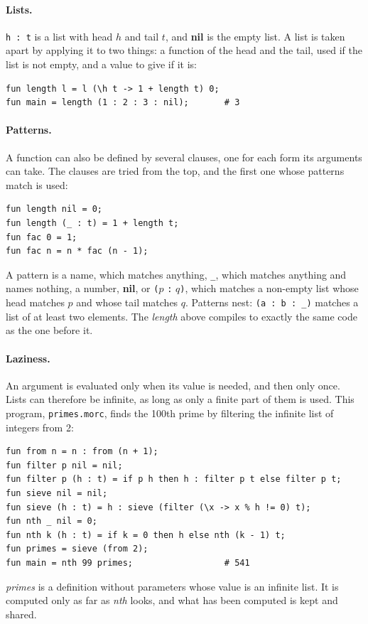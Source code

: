 \documentclass[11pt,a4paper]{article}
\theoremstyle{definition}
\theoremstyle{plain}
\newcommand{\kw}[1]{\textbf{#1}}
\begin{document}
\paragraph{Lists.} \verb|h : t| is a list with head $h$ and tail $t$, and
\kw{nil} is the empty list. A list is taken apart by applying it to two
things: a function of the head and the tail, used if the list is not empty,
and a value to give if it is:
\begin{lstlisting}[style=morc]
fun length l = l (\h t -> 1 + length t) 0;
fun main = length (1 : 2 : 3 : nil);       # 3
\end{lstlisting}

\paragraph{Patterns.} A function can also be defined by several clauses, one
for each form its arguments can take. The clauses are tried from the top,
and the first one whose patterns match is used:
\begin{lstlisting}[style=morc]
fun length nil = 0;
fun length (_ : t) = 1 + length t;
fun fac 0 = 1;
fun fac n = n * fac (n - 1);
\end{lstlisting}
A pattern is a name, which matches anything, \verb|_|, which matches anything
and names nothing, a number, \kw{nil}, or \verb|(|$p$ \verb|:| $q$\verb|)|,
which matches a non-empty list whose head matches $p$ and whose tail
matches $q$. Patterns nest: \verb|(a : b : _)| matches a list of at least two
elements. The \textit{length} above compiles to exactly the same code as the
one before it.

\paragraph{Laziness.} An argument is evaluated only when its value is needed,
and then only once. Lists can therefore be infinite, as long as only a finite
part of them is used. This program, \texttt{primes.morc}, finds the 100th
prime by filtering the infinite list of integers from 2:
\begin{lstlisting}[style=morc]
fun from n = n : from (n + 1);
fun filter p nil = nil;
fun filter p (h : t) = if p h then h : filter p t else filter p t;
fun sieve nil = nil;
fun sieve (h : t) = h : sieve (filter (\x -> x % h != 0) t);
fun nth _ nil = 0;
fun nth k (h : t) = if k = 0 then h else nth (k - 1) t;
fun primes = sieve (from 2);
fun main = nth 99 primes;                  # 541
\end{lstlisting}
\textit{primes} is a definition without parameters whose value is an infinite
list. It is computed only as far as \textit{nth} looks, and what has been
computed is kept and shared.
\end{document}
